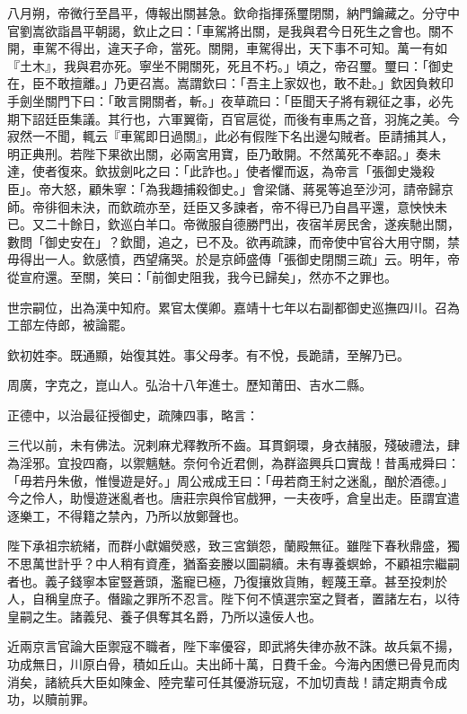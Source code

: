\begin{pinyinscope}
八月朔，帝微行至昌平，傳報出關甚急。欽命指揮孫璽閉關，納門鑰藏之。分守中官劉嵩欲詣昌平朝謁，欽止之曰：「車駕將出關，是我與君今日死生之會也。關不開，車駕不得出，違天子命，當死。關開，車駕得出，天下事不可知。萬一有如『土木』，我與君亦死。寧坐不開關死，死且不朽。」頃之，帝召璽。璽曰：「御史在，臣不敢擅離。」乃更召嵩。嵩謂欽曰：「吾主上家奴也，敢不赴。」欽因負敕印手劍坐關門下曰：「敢言開關者，斬。」夜草疏曰：「臣聞天子將有親征之事，必先期下詔廷臣集議。其行也，六軍翼衛，百官扈從，而後有車馬之音，羽旄之美。今寂然一不聞，輒云『車駕即日過關』，此必有假陛下名出邊勾賊者。臣請捕其人，明正典刑。若陛下果欲出關，必兩宮用寶，臣乃敢開。不然萬死不奉詔。」奏未達，使者復來。欽拔劍叱之曰：「此詐也。」使者懼而返，為帝言「張御史幾殺臣」。帝大怒，顧朱寧：「為我趣捕殺御史。」會梁儲、蔣冕等追至沙河，請帝歸京師。帝徘徊未決，而欽疏亦至，廷臣又多諫者，帝不得已乃自昌平還，意怏怏未已。又二十餘日，欽巡白羊口。帝微服自德勝門出，夜宿羊房民舍，遂疾馳出關，數問「御史安在」？欽聞，追之，已不及。欲再疏諫，而帝使中官谷大用守關，禁毋得出一人。欽感憤，西望痛哭。於是京師盛傳「張御史閉關三疏」云。明年，帝從宣府還。至關，笑曰：「前御史阻我，我今已歸矣」，然亦不之罪也。

世宗嗣位，出為漢中知府。累官太僕卿。嘉靖十七年以右副都御史巡撫四川。召為工部左侍郎，被論罷。

欽初姓李。既通顯，始復其姓。事父母孝。有不悅，長跪請，至解乃已。

周廣，字克之，崑山人。弘治十八年進士。歷知莆田、吉水二縣。

正德中，以治最征授御史，疏陳四事，略言：

三代以前，未有佛法。況剌麻尤釋教所不齒。耳貫銅環，身衣赭服，殘破禮法，肆為淫邪。宜投四裔，以禦魑魅。奈何令近君側，為群盜興兵口實哉！昔禹戒舜曰：「毋若丹朱傲，惟慢遊是好。」周公戒成王曰：「毋若商王紂之迷亂，酗於酒德。」今之伶人，助慢遊迷亂者也。唐莊宗與伶官戲狎，一夫夜呼，倉皇出走。臣謂宜遣逐樂工，不得籍之禁內，乃所以放鄭聲也。

陛下承祖宗統緒，而群小獻媚熒惑，致三宮鎖怨，蘭殿無征。雖陛下春秋鼎盛，獨不思萬世計乎？中人稍有資產，猶畜妾媵以圖嗣續。未有專養螟蛉，不顧祖宗繼嗣者也。義子錢寧本宦豎蒼頭，濫寵已極，乃復攘敚貨賄，輕蔑王章。甚至投刺於人，自稱皇庶子。僭踰之罪所不忍言。陛下何不慎選宗室之賢者，置諸左右，以待皇嗣之生。諸義兒、養子俱奪其名爵，乃所以遠佞人也。

近兩京言官論大臣禦寇不職者，陛下率優容，即武將失律亦赦不誅。故兵氣不揚，功成無日，川原白骨，積如丘山。夫出師十萬，日費千金。今海內困憊已骨見而肉消矣，諸統兵大臣如陳金、陸完輩可任其優游玩寇，不加切責哉！請定期責令成功，以贖前罪。


\end{pinyinscope}
